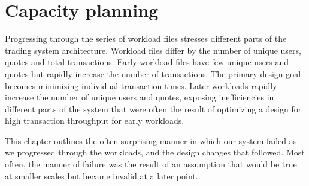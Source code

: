 \chapter{Capacity planning}
Progressing through the series of workload files stresses different parts of the trading system architecture.
Workload files differ by the number of unique users, quotes and total transactions.
Early workload files have few unique users and quotes but rapidly increase the number of transactions.
The primary design goal becomes minimizing individual transaction times.
Later workloads rapidly increase the number of unique users and quotes, exposing inefficiencies in different parts of the system that were often the result of optimizing a design for high transaction throughput for early workloads.

This chapter outlines the often surprising manner in which our system failed as we progressed through the workloads, and the design changes that followed.
Most often, the manner of failure was the result of an assumption that would be true at smaller scales but became invalid at a later point.
